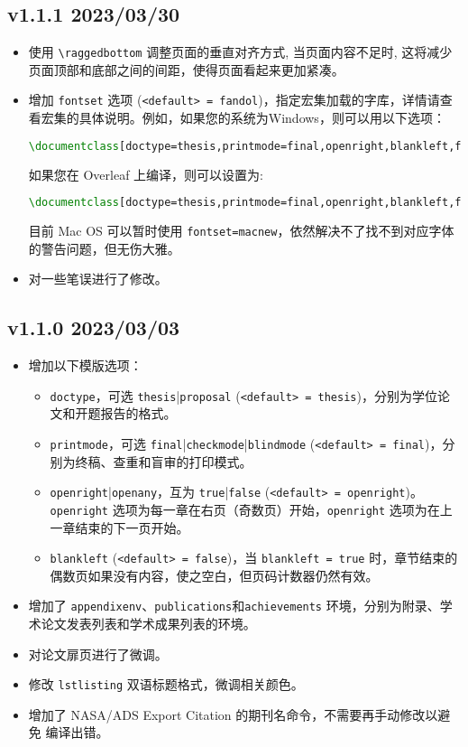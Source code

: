 \subsection*{v1.1.1 2023/03/30}
\begin{itemize}
    \item 使用 \texttt{\textbackslash raggedbottom} 调整页面的垂直对齐方式, 当页面内容不足时, 这将减少页面顶部和底部之间的间距，使得页面看起来更加紧凑。
    \item 增加 \texttt{fontset} 选项 (\texttt{<default> = fandol})，指定\CTeX{}宏集加载的字库，详情请查看\CTeX{}宏集的具体说明。例如，如果您的系统为Windows，则可以用以下选项：
\begin{lstlisting}[language=TeX]
\documentclass[doctype=thesis,printmode=final,openright,blankleft,fontset=windows]{sysuthesis}
\end{lstlisting}
    如果您在 Overleaf 上编译，则可以设置为:
\begin{lstlisting}[language=TeX]
\documentclass[doctype=thesis,printmode=final,openright,blankleft,fontset=ubuntu]{sysuthesis}
\end{lstlisting}
    目前 Mac OS 可以暂时使用 \texttt{fontset=macnew}，依然解决不了找不到对应字体的警告问题，但无伤大雅。
    \item 对一些笔误进行了修改。
\end{itemize}

\subsection*{v1.1.0 2023/03/03}
\begin{itemize}
    \item 增加以下模版选项：
    \begin{itemize}
        \item \texttt{doctype}，可选 \texttt{thesis}|\texttt{proposal} (\texttt{<default> = thesis})，分别为学位论文和开题报告的格式。
        \item \texttt{printmode}，可选 \texttt{final}|\texttt{checkmode}|\texttt{blindmode} (\texttt{<default> = final})，分别为终稿、查重和盲审的打印模式。
        \item \texttt{openright}|\texttt{openany}，互为 \texttt{true}|\texttt{false} (\texttt{<default> = openright})。\texttt{openright} 选项为每一章在右页（奇数页）开始，\texttt{openright} 选项为在上一章结束的下一页开始。
        \item \texttt{blankleft} (\texttt{<default> = false})，当 \texttt{blankleft = true} 时，章节结束的偶数页如果没有内容，使之空白，但页码计数器仍然有效。
    \end{itemize}
    \item 增加了 \texttt{appendixenv}、\texttt{publications}和\texttt{achievements} 环境，分别为附录、学术论文发表列表和学术成果列表的环境。
    \item 对论文扉页进行了微调。
    \item 修改 \texttt{lstlisting} 双语标题格式，微调相关颜色。
    \item 增加了 NASA/ADS Export Citation 的期刊名命令，不需要再手动修改以避免  编译出错。
\end{itemize}

